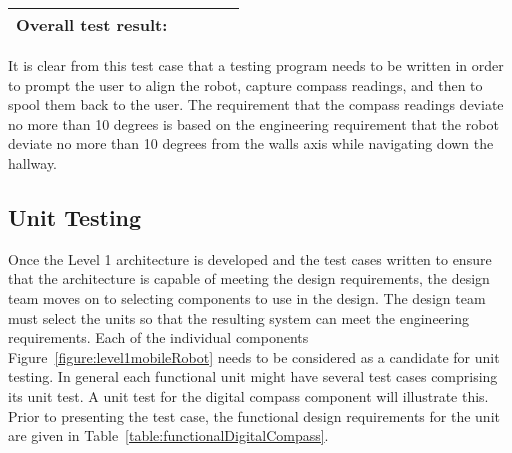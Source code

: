 \begin{table}[h]
\begin{tabular}{|m{1cm}|m{2cm}|m{2cm}|m{1cm}|m{1cm}|m{1cm}|m{2cm}|m{2cm}|}
\multicolumn{3}{l}{\textbf{Overall test result:}} &   &  &  & \multicolumn{2}{l}{}\\ \hline
\end{tabular}
\end{table}

It is clear from this test case that a testing program needs to be
written in order to prompt the user to align the robot, capture compass
readings, and then to spool them back to the user. The requirement that
the compass readings deviate no more than 10 degrees is based on the
engineering requirement that the robot deviate no more than 10 degrees
from the walls axis while navigating down the hallway.

\subsection*{Unit Testing}
\label{subsection:unit-testing-1}


Once the Level 1 architecture is developed and the test cases written to
ensure that the architecture is capable of meeting the design
requirements, the design team moves on to selecting components to use in
the design. The design team must select the units so that the resulting
system can meet the engineering requirements. Each of the individual
components Figure~\ref{figure:level1mobileRobot}
needs to be considered as a candidate for unit
testing. In general each functional unit might have several test cases
comprising its unit test. A unit test for the digital compass component
will illustrate this. Prior to presenting the test case, the functional
design requirements for the unit are given in 
Table~\ref{table:functionalDigitalCompass}.



